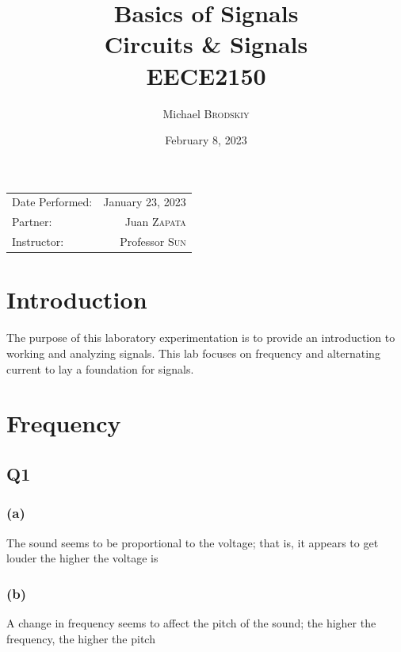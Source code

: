 \documentclass[
	letterpaper, %
	10pt, %
]{CSUniSchoolLabReport}
\title{Basics of Signals \\ Circuits \& Signals \\ EECE2150} %
\author{Michael \textsc{Brodskiy}}
\date{February 8, 2023} %
\begin{document}
\maketitle %

\begin{center}
	\begin{tabular}{l r}
		Date Performed: & January 23, 2023 \\ %
        Partner: & Juan \textsc{Zapata} \\ %
		Instructor: & Professor \textsc{Sun} %
	\end{tabular}
\end{center}

\setcounter{section}{-1}

\section{Introduction}

The purpose of this laboratory experimentation is to provide an introduction to working and analyzing signals. This lab focuses on frequency and alternating current to lay a foundation for signals.

\section{Frequency}

\subsection{Q1}

\subsubsection{(a)} The sound seems to be proportional to the voltage; that is, it appears to get louder the higher the voltage is

\subsubsection{(b)} A change in frequency seems to affect the pitch of the sound; the higher the frequency, the higher the pitch
\end{document}
